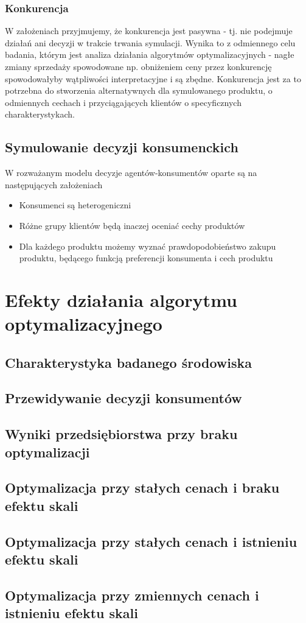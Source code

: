 \documentclass{article}
\begin{document}
\subsubsection{Konkurencja}
 
W założeniach przyjmujemy, że konkurencja jest pasywna - tj. nie podejmuje działań ani decyzji w trakcie trwania symulacji. Wynika to z odmiennego celu badania, którym jest analiza działania algorytmów optymalizacyjnych - nagłe zmiany sprzedaży spowodowane np. obniżeniem ceny przez konkurencję spowodowałyby wątpliwości interpretacyjne i są zbędne. Konkurencja jest za to potrzebna do stworzenia alternatywnych dla symulowanego produktu, o odmiennych cechach i przyciągających klientów o specyficznych charakterystykach. 

\subsection{Symulowanie decyzji konsumenckich}

W rozważanym modelu decyzje agentów-konsumentów oparte są na następujących założeniach

	\begin{itemize}
		\item Konsumenci są heterogeniczni
		\item Różne grupy klientów będą inaczej oceniać cechy produktów
		\item Dla każdego produktu możemy wyznać prawdopodobieństwo zakupu produktu, będącego funkcją preferencji konsumenta i cech produktu
	\end{itemize}



\newpage
\section{Efekty działania algorytmu optymalizacyjnego}
\subsection{Charakterystyka badanego środowiska}
\subsection{Przewidywanie decyzji konsumentów}
\subsection{Wyniki przedsiębiorstwa przy braku optymalizacji}
\subsection{Optymalizacja przy stałych cenach i braku efektu skali}
\subsection{Optymalizacja przy stałych cenach i istnieniu efektu skali}
\subsection{Optymalizacja przy zmiennych cenach i istnieniu efektu skali}



\end{document}
